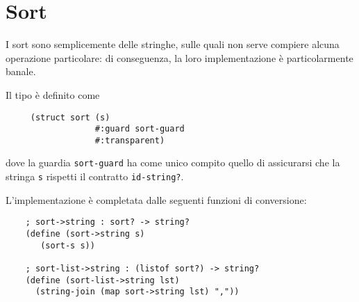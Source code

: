 \section{Sort}

I sort sono semplicemente delle stringhe, sulle quali non serve compiere
alcuna operazione particolare: di conseguenza, la loro implementazione
\`e particolarmente banale.

Il tipo \`e definito come

\begin{lstlisting}
     (struct sort (s)
                  #:guard sort-guard
                  #:transparent)
\end{lstlisting}

dove la guardia \lstinline{sort-guard} ha come unico compito quello di
assicurarsi che la stringa \lstinline{s} rispetti il contratto
\lstinline{id-string?}.

L'implementazione \`e completata dalle seguenti funzioni di conversione:

\begin{lstlisting}
    ; sort->string : sort? -> string?
    (define (sort->string s)
       (sort-s s))

    ; sort-list->string : (listof sort?) -> string?
    (define (sort-list->string lst)
      (string-join (map sort->string lst) ","))
\end{lstlisting}
